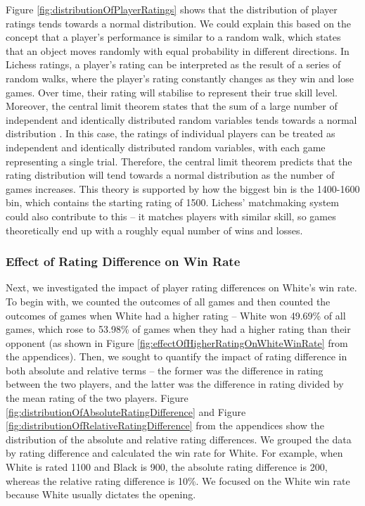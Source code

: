 \documentclass[a4paper, 11pt]{article}
\begin{document}
Figure \ref{fig:distributionOfPlayerRatings} shows that the distribution of player ratings tends towards a normal distribution. We could explain this based on the concept that a player's performance is similar to a random walk, which states that an object moves randomly with equal probability in different directions. In Lichess ratings, a player's rating can be interpreted as the result of a series of random walks, where the player's rating constantly changes as they win and lose games. Over time, their rating will stabilise to represent their true skill level. Moreover, the central limit theorem states that the sum of a large number of independent and identically distributed random variables tends towards a normal distribution \cite{le1986central}. In this case, the ratings of individual players can be treated as independent and identically distributed random variables, with each game representing a single trial. Therefore, the central limit theorem predicts that the rating distribution will tend towards a normal distribution as the number of games increases. This theory is supported by how the biggest bin is the 1400-1600 bin, which contains the starting rating of 1500. Lichess' matchmaking system could also contribute to this -- it matches players with similar skill, so games theoretically end up with a roughly equal number of wins and losses.

\subsubsection{Effect of Rating Difference on Win Rate}
Next, we investigated the impact of player rating differences on White's win rate. To begin with, we counted the outcomes of all games and then counted the outcomes of games when White had a higher rating -- White won 49.69\% of all games, which rose to 53.98\% of games when they had a higher rating than their opponent (as shown in Figure \ref{fig:effectOfHigherRatingOnWhiteWinRate} from the appendices). Then, we sought to quantify the impact of rating difference in both absolute and relative terms -- the former was the difference in rating between the two players, and the latter was the difference in rating divided by the mean rating of the two players. Figure \ref{fig:distributionOfAbsoluteRatingDifference} and Figure \ref{fig:distributionOfRelativeRatingDifference} from the appendices show the distribution of the absolute and relative rating differences. We grouped the data by rating difference and calculated the win rate for White. For example, when White is rated 1100 and Black is 900, the absolute rating difference is 200, whereas the relative rating difference is 10\%. We focused on the White win rate because White usually dictates the opening.
\end{document}
